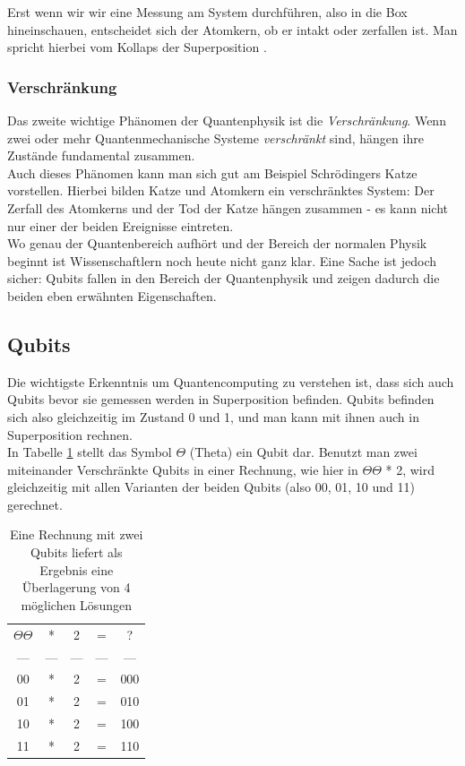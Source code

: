 \documentclass[12pt]{article}
\begin{document}
Erst wenn wir wir eine Messung am System durchführen, also in die Box hineinschauen, entscheidet sich der Atomkern, ob er intakt oder zerfallen ist. Man spricht hierbei vom Kollaps der Superposition \cite{KollapsWiki}.

\subsubsection{Verschränkung}

Das zweite wichtige Phänomen der Quantenphysik ist die \textit{Verschränkung}. Wenn zwei oder mehr Quantenmechanische Systeme \textit{verschränkt} sind, hängen ihre Zustände fundamental zusammen. \cite{mavroeidis2018impact} \\
Auch dieses Phänomen kann man sich gut am Beispiel Schrödingers Katze vorstellen. Hierbei bilden Katze und Atomkern ein verschränktes System: Der Zerfall des Atomkerns und der Tod der Katze hängen zusammen - es kann nicht nur einer der beiden Ereignisse eintreten. \\

Wo genau der Quantenbereich aufhört und der Bereich der normalen Physik beginnt ist Wissenschaftlern noch heute nicht ganz klar. Eine Sache ist jedoch sicher: Qubits fallen in den Bereich der Quantenphysik und zeigen dadurch die beiden eben erwähnten Eigenschaften.

\subsection{Qubits}

Die wichtigste Erkenntnis um Quantencomputing zu verstehen ist, dass sich auch Qubits bevor sie gemessen werden in Superposition befinden. Qubits befinden sich also gleichzeitig im Zustand 0 und 1, und man kann mit ihnen auch in Superposition rechnen. \cite{mavroeidis2018impact} \\

In Tabelle \ref{tab:QubitRechnung} stellt das Symbol \(\Theta\) (Theta) ein Qubit dar. Benutzt man zwei miteinander Verschränkte Qubits in einer Rechnung, wie hier in \(\Theta\Theta\) * 2, wird gleichzeitig mit allen Varianten der beiden Qubits (also 00, 01, 10 und 11) gerechnet.

\begin{table}[h]
    \centering
    \begin{tabular}{ccccc}
        \(\Theta\Theta\) & * & 2 & = & ?\\
        --- & --- & --- & --- & --- \\
        00 & * & 2 & = & 000\\
        01 & * & 2 & = & 010\\
        10 & * & 2 & = & 100\\
        11 & * & 2 & = & 110\\
    \end{tabular}
    \caption{Eine Rechnung mit zwei Qubits liefert als Ergebnis eine Überlagerung von 4 möglichen Lösungen}
    \label{tab:QubitRechnung}
\end{table}
\end{document}
